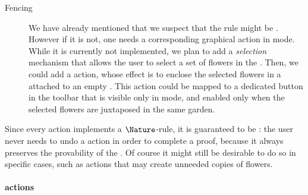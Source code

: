 \begin{scope}
\begin{description}
  \item[Fencing] We have already mentioned that we suspect that the
   rule might be . However if it is not, one needs a
  corresponding graphical action in \Proof mode. While it is currently not
  implemented, we plan to add a \emph{selection} mechanism that allows the user
  to select a set of flowers in the . Then, we could add a 
  action, whose effect is to enclose the selected flowers in a  attached to
  an empty . This action could be mapped to a dedicated button in the
  toolbar that is visible only in \Proof mode, and enabled only when the
  selected flowers are juxtaposed in the same garden.
\end{description}

Since every \Proof action implements a $\Nature$-rule, it is guaranteed to be
\emph{}: the user never needs to undo a \Proof action in order to
complete a proof, because it always preserves the provability of the . Of
course it might still be desirable to do so in specific cases, such as
 actions that may create unneeded copies of flowers.

\paragraph{\Edit actions}


\end{scope}
